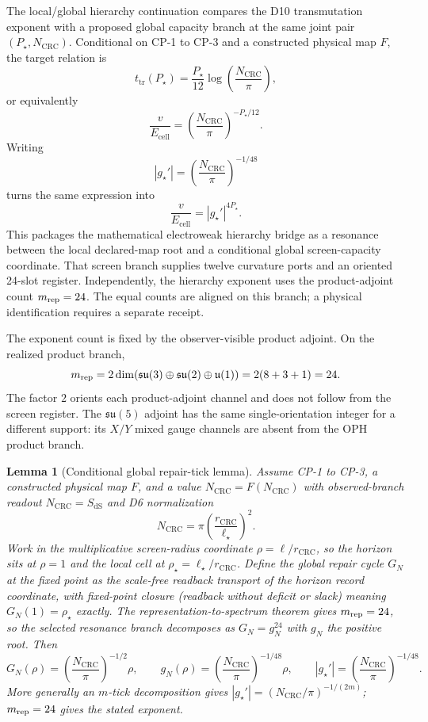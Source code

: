 \documentclass[11pt]{article}
\newtheorem{lemma}[theorem]{Lemma}
\begin{document}
The local/global hierarchy continuation compares the D10 transmutation exponent with a proposed
global capacity branch at the same joint pair \((P_\star,N_{\mathrm{CRC}})\). Conditional on
CP-1 to CP-3 and a constructed physical map \(F\), the target relation is
\[
t_{\mathrm{tr}}(P_\star)
=
\frac{P_\star}{12}
\log\!\left(\frac{N_{\mathrm{CRC}}}{\pi}\right),
\]
or equivalently
\[
\frac{v}{E_{\mathrm{cell}}}
=
\left(\frac{N_{\mathrm{CRC}}}{\pi}\right)^{-P_\star/12}.
\]
Writing
\[
|g_\star'|
=
\left(\frac{N_{\mathrm{CRC}}}{\pi}\right)^{-1/48}
\]
turns the same expression into
\[
\frac{v}{E_{\mathrm{cell}}}
=
|g_\star'|^{4P_\star}.
\]
This packages the mathematical electroweak hierarchy bridge as a resonance between the local
declared-map root and a conditional global screen-capacity coordinate. That screen branch supplies
twelve curvature ports and an oriented 24-slot register. Independently, the hierarchy exponent uses
the product-adjoint count \(m_{\rm rep}=24\). The equal counts are aligned on this branch; a physical
identification requires a separate receipt.

The exponent count is fixed by the observer-visible product adjoint. On the realized
product branch,
\[
m_{\rm rep}
=2\dim(\mathfrak{su}(3)\oplus\mathfrak{su}(2)\oplus\mathfrak u(1))
=2(8+3+1)
=24.
\]
The factor \(2\) orients each product-adjoint channel and does not follow from the screen register. The
\(\mathfrak{su}(5)\) adjoint has the same single-orientation integer for a different support:
its \(X/Y\) mixed gauge channels are absent from the OPH product branch.

\begin{lemma}[Conditional global repair-tick lemma]\label{lem:global-repair-tick}
Assume CP-1 to CP-3, a constructed physical map \(F\), and a value
\(N_{\mathrm{CRC}}=F(N_{\mathrm{CRC}})\) with
observed-branch readout \(N_{\mathrm{CRC}}=S_{\mathrm{dS}}\) and D6 normalization
\[
N_{\mathrm{CRC}}=\pi\left(\frac{r_{\mathrm{CRC}}}{\ell_\star}\right)^2.
\]
Work in the multiplicative screen-radius coordinate \(\rho=\ell/r_{\mathrm{CRC}}\), so the
horizon sits at \(\rho=1\) and the local cell at \(\rho_\star=\ell_\star/r_{\mathrm{CRC}}\).
Define the global repair cycle \(G_N\) at the fixed point as the scale-free readback transport
of the horizon record coordinate, with fixed-point closure (readback without deficit or slack)
meaning \(G_N(1)=\rho_\star\) exactly. The representation-to-spectrum theorem gives
\(m_{\rm rep}=24\), so the selected resonance branch decomposes as \(G_N=g_N^{24}\) with
\(g_N\) the positive root. Then
\[
G_N(\rho)
=
\left(\frac{N_{\mathrm{CRC}}}{\pi}\right)^{-1/2}\rho,
\qquad
g_N(\rho)
=
\left(\frac{N_{\mathrm{CRC}}}{\pi}\right)^{-1/48}\rho,
\qquad
|g_\star'|=\left(\frac{N_{\mathrm{CRC}}}{\pi}\right)^{-1/48}.
\]
More generally an \(m\)-tick decomposition gives
\(|g_\star'|=(N_{\mathrm{CRC}}/\pi)^{-1/(2m)}\); \(m_{\rm rep}=24\) gives the stated
exponent.
\end{lemma}
\end{document}
